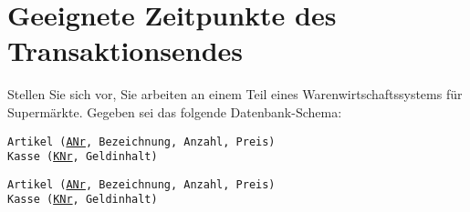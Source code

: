 \section{Geeignete Zeitpunkte des Transaktionsendes}

Stellen Sie sich vor, Sie arbeiten an einem Teil eines Warenwirtschaftssystems für Supermärkte. Gegeben sei das folgende Datenbank-Schema:

	\texttt{Artikel (\underline{ANr}, Bezeichnung, Anzahl, Preis)} \\
	\texttt{Kasse (\underline{KNr}, Geldinhalt)}

\begin{beamerText}
\pagebreak
\texttt{Artikel (\underline{ANr}, Bezeichnung, Anzahl, Preis)} \\
\texttt{Kasse (\underline{KNr}, Geldinhalt)}
\end{beamerText}

